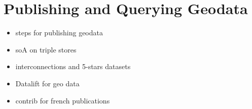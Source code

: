 
\chapter{Publishing and Querying Geodata }
\label{ch:ch2}

\begin{itemize}
\item steps for publishing geodata
\item soA on triple stores 
\item interconnections and 5-stars datasets
\item Datalift for geo data
\item contrib for french publications
\end{itemize}


